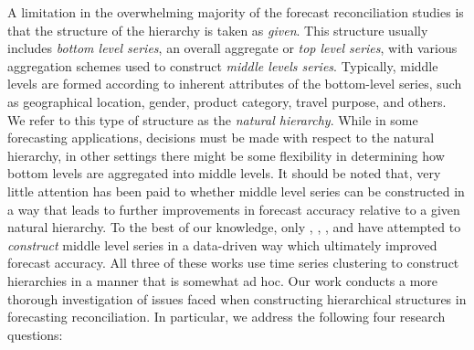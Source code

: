 \documentclass[a4paper,review,12pt,authoryear]{elsarticle}
\begin{document}
A limitation in the overwhelming majority of the forecast reconciliation studies is that the structure of the hierarchy is taken as \textit{given}. This structure usually includes \textit{bottom level series}, an overall aggregate or \textit{top level series}, with various aggregation schemes used to construct \textit{middle levels series}. Typically, middle levels are formed according to inherent attributes of the bottom-level series, such as geographical location, gender, product category, travel purpose, and others. We refer to this type of structure as the \textit{natural hierarchy}. While in some forecasting applications, decisions must be made with respect to the natural hierarchy, in other settings there might be some flexibility in determining how bottom levels are aggregated into middle levels. It should be noted that,  very little attention has been paid to whether middle level series can be constructed in a way that leads to further improvements in forecast accuracy relative to a given natural hierarchy. To the best of our knowledge, only \cite{pangHierarchicalElectricityTime2018}, \cite{liForecastReconciliationApproach2019}, \cite{pangHierarchicalElectricityTime2022}, and \cite{matteraImprovingOutofSampleForecasts2023} have attempted to \textit{construct} middle level series in a data-driven way which ultimately improved forecast accuracy. All three of these works use time series clustering to construct hierarchies in a manner that is somewhat ad hoc. Our work conducts a more thorough investigation of issues faced when  constructing hierarchical structures in forecasting reconciliation. In particular, we address the following four research questions:%



\end{document}

